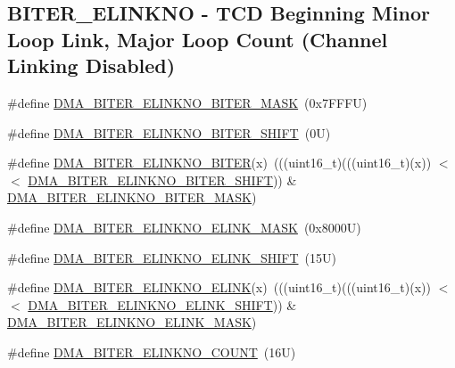\subsection*{B\+I\+T\+E\+R\+\_\+\+E\+L\+I\+N\+K\+NO -\/ T\+CD Beginning Minor Loop Link, Major Loop Count (Channel Linking Disabled)}
\begin{DoxyCompactItemize}
\item 
\#define \mbox{\hyperlink{group___d_m_a___register___masks_gae018437bb5b22efe7ef42c909c0ddc3e}{D\+M\+A\+\_\+\+B\+I\+T\+E\+R\+\_\+\+E\+L\+I\+N\+K\+N\+O\+\_\+\+B\+I\+T\+E\+R\+\_\+\+M\+A\+SK}}~(0x7\+F\+F\+F\+U)
\item 
\#define \mbox{\hyperlink{group___d_m_a___register___masks_gac759c623fdfd96b0bb47471802d9dba8}{D\+M\+A\+\_\+\+B\+I\+T\+E\+R\+\_\+\+E\+L\+I\+N\+K\+N\+O\+\_\+\+B\+I\+T\+E\+R\+\_\+\+S\+H\+I\+FT}}~(0\+U)
\item 
\#define \mbox{\hyperlink{group___d_m_a___register___masks_ga380cdfa3ebd8d6413ebefa25de22b4de}{D\+M\+A\+\_\+\+B\+I\+T\+E\+R\+\_\+\+E\+L\+I\+N\+K\+N\+O\+\_\+\+B\+I\+T\+ER}}(x)~(((uint16\+\_\+t)(((uint16\+\_\+t)(x)) $<$$<$ \mbox{\hyperlink{group___d_m_a___register___masks_gac759c623fdfd96b0bb47471802d9dba8}{D\+M\+A\+\_\+\+B\+I\+T\+E\+R\+\_\+\+E\+L\+I\+N\+K\+N\+O\+\_\+\+B\+I\+T\+E\+R\+\_\+\+S\+H\+I\+FT}})) \& \mbox{\hyperlink{group___d_m_a___register___masks_gae018437bb5b22efe7ef42c909c0ddc3e}{D\+M\+A\+\_\+\+B\+I\+T\+E\+R\+\_\+\+E\+L\+I\+N\+K\+N\+O\+\_\+\+B\+I\+T\+E\+R\+\_\+\+M\+A\+SK}})
\item 
\#define \mbox{\hyperlink{group___d_m_a___register___masks_ga3ae8b9da1a0c899d39608bc0b92ddd43}{D\+M\+A\+\_\+\+B\+I\+T\+E\+R\+\_\+\+E\+L\+I\+N\+K\+N\+O\+\_\+\+E\+L\+I\+N\+K\+\_\+\+M\+A\+SK}}~(0x8000\+U)
\item 
\#define \mbox{\hyperlink{group___d_m_a___register___masks_gabd481ef160447f9125c779d6483649f0}{D\+M\+A\+\_\+\+B\+I\+T\+E\+R\+\_\+\+E\+L\+I\+N\+K\+N\+O\+\_\+\+E\+L\+I\+N\+K\+\_\+\+S\+H\+I\+FT}}~(15\+U)
\item 
\#define \mbox{\hyperlink{group___d_m_a___register___masks_ga1d189552eb2ef437cbed5bfc5658560d}{D\+M\+A\+\_\+\+B\+I\+T\+E\+R\+\_\+\+E\+L\+I\+N\+K\+N\+O\+\_\+\+E\+L\+I\+NK}}(x)~(((uint16\+\_\+t)(((uint16\+\_\+t)(x)) $<$$<$ \mbox{\hyperlink{group___d_m_a___register___masks_gabd481ef160447f9125c779d6483649f0}{D\+M\+A\+\_\+\+B\+I\+T\+E\+R\+\_\+\+E\+L\+I\+N\+K\+N\+O\+\_\+\+E\+L\+I\+N\+K\+\_\+\+S\+H\+I\+FT}})) \& \mbox{\hyperlink{group___d_m_a___register___masks_ga3ae8b9da1a0c899d39608bc0b92ddd43}{D\+M\+A\+\_\+\+B\+I\+T\+E\+R\+\_\+\+E\+L\+I\+N\+K\+N\+O\+\_\+\+E\+L\+I\+N\+K\+\_\+\+M\+A\+SK}})
\item 
\#define \mbox{\hyperlink{group___d_m_a___register___masks_ga874be0a910ec4c5181fb4275a25effda}{D\+M\+A\+\_\+\+B\+I\+T\+E\+R\+\_\+\+E\+L\+I\+N\+K\+N\+O\+\_\+\+C\+O\+U\+NT}}~(16\+U)
\end{DoxyCompactItemize}
